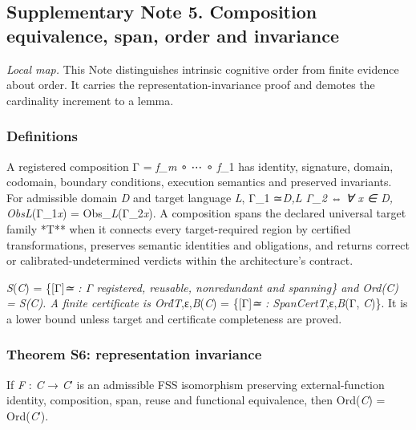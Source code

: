 \hypertarget{supplementary-note-5.-composition-equivalence-span-order-and-invariance}{%
\subsection{Supplementary Note 5. Composition equivalence, span, order
and
invariance}\label{supplementary-note-5.-composition-equivalence-span-order-and-invariance}}

\emph{Local map.} This Note distinguishes intrinsic cognitive order from
finite evidence about order. It carries the representation-invariance
proof and demotes the cardinality increment to a lemma.

\hypertarget{definitions}{%
\subsubsection{Definitions}\label{definitions}}

A registered composition Γ = \emph{f\_m} ∘ ⋯ ∘ \emph{f}\_1 has identity,
signature, domain, codomain, boundary conditions, execution semantics
and preserved invariants. For admissible domain \emph{D} and target
language \emph{L}, Γ\_1 ≃\emph{\emph{D},\emph{L} Γ\_2 ⇔ ∀ \emph{x} ∈
\emph{D}, ObsL}(Γ\_1\emph{x}) = Obs\_\emph{L}(Γ\_2\emph{x}). A
composition spans the declared universal target family *T** when it
connects every target-required region by certified transformations,
preserves semantic identities and obligations, and returns correct or
calibrated-undetermined verdicts within the architecture's contract.

\emph{S}(\emph{C}) = \{{[}Γ{]}\emph{≃ : Γ registered, reusable,
nonredundant and spanning\} and Ord(\emph{C}) =
\textbar{}\emph{S}(\emph{C})\textbar. A finite certificate is
Ord̂T},ε,\emph{B}(\emph{C}) = \textbar\{{[}Γ{]}\emph{≃ :
SpanCertT},ε,\emph{B}(Γ, \emph{C})\}\textbar. It is a lower bound unless
target and certificate completeness are proved.

\hypertarget{theorem-s6-representation-invariance}{%
\subsubsection{Theorem S6: representation
invariance}\label{theorem-s6-representation-invariance}}

If \emph{F} : \emph{C} → \emph{C}′ is an admissible FSS isomorphism
preserving external-function identity, composition, span, reuse and
functional equivalence, then Ord(\emph{C}) = Ord(\emph{C}′).

